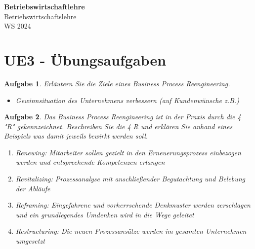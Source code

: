 \documentclass[11pt]{article}
\begin{document}
\thispagestyle{empty}

\newtheorem{anmk}{Anmerkung}[section]
\newtheorem{bsp}{Beispiel}[section]
\newtheorem{definition}{Definition}[section]
\newtheorem{aufgabe}{Aufgabe}[section]

\renewcommand{\figurename}{Fig.}

\newcommand{\ol}[1]{\begin{enumerate}#1\end{enumerate}}
\newcommand{\ul}[1]{\begin{itemize}#1\end{itemize}}

\begin{center}
  {\LARGE \bf Betriebswirtschaftlehre}\\
  {\Large Betriebswirtschaftslehre}\\
  WS 2024
\end{center}

\section{UE3 - Übungsaufgaben}
\begin{aufgabe}
  Erläutern Sie die Ziele eines Business Process Reengineering.
  \ul{
    \item Gewinnsituation des Unternehmens verbessern (auf Kundenwünsche z.B.)
  }
\end{aufgabe}

\begin{aufgabe}
  Das Business Process Reengineering ist in der Praxis durch die 4 "R" gekennzeichnet. Beschreiben Sie die 4 R und erklären
  Sie anhand eines Beispiels was damit jeweils bewirkt werden soll.
  \ol{
    \item Renewing: Mitarbeiter sollen gezielt in den Erneuerungsprozess einbezogen werden und entsprechende Kompetenzen erlangen
    \item Revitalizing: Prozessanalyse mit anschließender Begutachtung und Belebung der Abläufe
    \item Reframing: Eingefahrene und vorherrschende Denkmuster werden zerschlagen und ein grundlegendes Umdenken wird in
          die Wege geleitet
    \item Restructuring: Die neuen Prozessansätze werden im gesamten Unternehmen umgesetzt
  }
\end{aufgabe}
\end{document}
